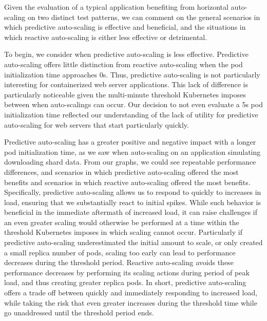 Given the evaluation of a typical application benefiting from horizontal
auto-scaling on two distinct test patterns, we can comment on the general
scenarios in which predictive auto-scaling is effective and beneficial, and the
situations in which reactive auto-scaling is either less effective or
detrimental.

To begin, we consider when predictive auto-scaling is less
effective. Predictive auto-scaling offers little distinction from reactive
auto-scaling when the pod initialization time approaches 0s. Thus, predictive
auto-scaling is not particularly interesting for containerized web server
applications. This lack of difference is particularly noticeable given the
multi-minute threshold Kubernetes imposes between when auto-scalings can occur.
Our decision to not even evaluate a 5s pod initialization time reflected our
understanding of the lack of utility for predictive auto-scaling for web servers
that start particularly quickly.

Predictive auto-scaling has a greater positive and negative impact
with a longer pod initialization time, as we saw when auto-scaling on an
application simulating downloading shard data. From our graphs, we could see
repeatable performance differences, and scenarios in which predictive
auto-scaling offered the most benefits and scenarios in which reactive
auto-scaling offered the most benefits. Specifically, predictive auto-scaling
allows us to respond to quickly to increases in load, ensuring that we
substantially react to initial spikes. While such behavior is beneficial in the
immediate aftermath of increased load, it can raise challenges if an even
greater scaling would otherwise be performed at a time within the
threshold Kubernetes imposes in
which scaling cannot occur. Particularly if predictive auto-scaling
underestimated the initial amount to scale, or only created a small replica
number of pods, scaling too early can lead to
performance decreases during the threshold period. Reactive auto-scaling avoids
these performance decreases by performing its scaling actions during period of
peak load, and thus creating greater replica pods. In short, predictive
auto-scaling offers a trade off between quickly and immediately responding to
increased load, while taking the risk that even greater increases during the
threshold time while go unaddressed until the threshold period ends.

